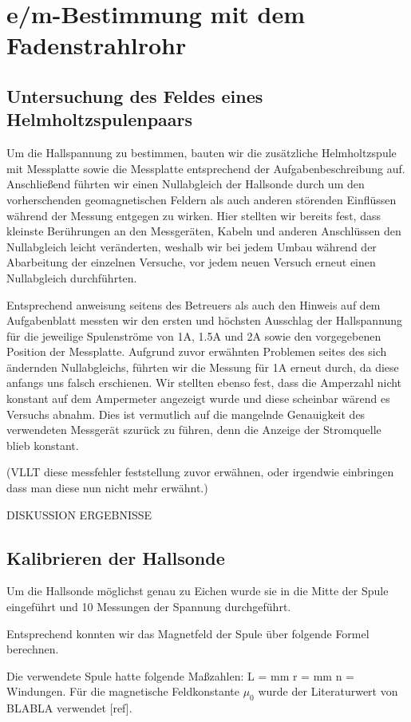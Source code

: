 \chapter{e/m-Bestimmung mit dem Fadenstrahlrohr}
\section{Untersuchung des Feldes eines Helmholtzspulenpaars}
Um die Hallspannung zu bestimmen, bauten wir die zusätzliche Helmholtzspule mit Messplatte sowie die Messplatte entsprechend der Aufgabenbeschreibung auf. Anschließend führten wir einen Nullabgleich der Hallsonde durch um den vorherschenden geomagnetischen Feldern als auch anderen störenden Einflüssen während der Messung entgegen zu wirken. Hier stellten wir bereits fest, dass kleinste Berührungen an den Messgeräten, Kabeln und anderen Anschlüssen den Nullabgleich leicht veränderten, weshalb wir bei jedem Umbau während der Abarbeitung der einzelnen Versuche,  vor jedem neuen Versuch erneut einen Nullabgleich durchführten.

Entsprechend anweisung seitens des Betreuers als auch den Hinweis auf dem Aufgabenblatt messten wir den ersten und höchsten Ausschlag  der Hallspannung für die jeweilige Spulenströme von 1A, 1.5A und 2A sowie den vorgegebenen Position der Messplatte. Aufgrund zuvor erwähnten Problemen seites des sich ändernden Nullabgleichs, führten wir die Messung für 1A erneut durch, da diese anfangs uns falsch erschienen. Wir stellten ebenso fest, dass die Amperzahl nicht konstant auf dem Ampermeter angezeigt wurde und diese scheinbar wärend es Versuchs abnahm. Dies ist vermutlich auf die mangelnde Genauigkeit des verwendeten Messgerät szurück zu führen, denn die Anzeige der Stromquelle blieb konstant.

(VLLT diese messfehler feststellung zuvor erwähnen, oder irgendwie einbringen dass man diese nun nicht mehr erwähnt.)


DISKUSSION ERGEBNISSE
\section{Kalibrieren der Hallsonde}
Um die Hallsonde möglichst genau zu Eichen wurde sie in die Mitte der Spule eingeführt und 10 Messungen der Spannung durchgeführt. 

Entsprechend konnten wir das Magnetfeld der Spule über folgende Formel berechnen.



Die verwendete Spule hatte folgende Maßzahlen:
L = mm
r = mm
n = Windungen.
 Für die magnetische Feldkonstante $\mu_0$ wurde der Literaturwert von BLABLA verwendet [ref]. 
 

